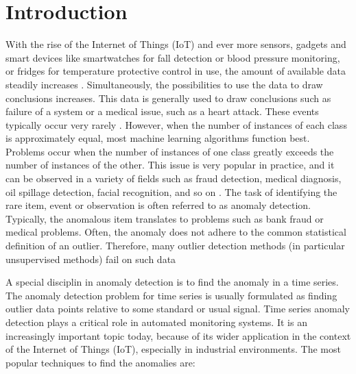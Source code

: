 
\chapter{Introduction} %

\label{1.} %


\newcommand{\keyword}[1]{\textbf{#1}}
\newcommand{\tabhead}[1]{\textbf{#1}}
\newcommand{\code}[1]{\texttt{#1}}
\newcommand{\file}[1]{\texttt{\bfseries#1}}
\newcommand{\option}[1]{\texttt{\itshape#1}}




With the rise of the Internet of Things (IoT) and ever more sensors, gadgets and smart devices like smartwatches for fall detection or blood pressure monitoring, or fridges for temperature protective control in use, the amount of available data steadily increases \parencite{Alansari2018}. Simultaneously, the possibilities to use the data to draw conclusions increases. This data is generally used to draw conclusions such as failure of a system or a medical issue, such as a heart attack. These events typically occur very rarely \parencite{Hauskrecht2007}. However, when the number of instances of each class is approximately equal, most machine learning algorithms function best. Problems occur when the number of instances of one class greatly exceeds the number of instances of the other. This issue is very popular in practice, and it can be observed in a variety of fields such as fraud detection, medical diagnosis, oil spillage detection, facial recognition, and so on \parencite{Thabtah2020}. The task of identifying the rare item, event or observation is often referred to as anomaly detection. Typically, the anomalous item translates to problems such as bank fraud or medical problems. Often, the anomaly does not adhere to the common statistical definition of an outlier. Therefore, many outlier detection methods (in particular unsupervised methods) fail on such data \parencite{Hodge2004}

A special disciplin in anomaly detection is to find the anomaly in a time series. The anomaly detection problem for time series is usually formulated as finding outlier data points relative to some standard or usual signal. Time series anomaly detection plays a critical role in automated monitoring systems. It is an increasingly important topic today, because of its wider application in the context of the Internet of Things (IoT), especially in industrial environments. The most popular techniques to find the anomalies are:

